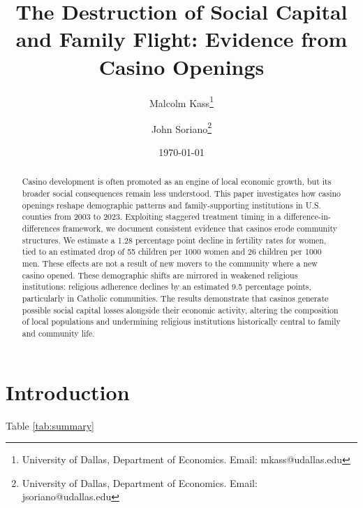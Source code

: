 \documentclass[12pt]{article}
\title{The Destruction of Social Capital and Family Flight: Evidence from Casino Openings}
\author{Malcolm Kass\thanks{University of Dallas, Department of Economics. Email: mkass@udallas.edu} \and John Soriano\thanks{University of Dallas, Department of Economics. Email: jsoriano@udallas.edu}}
\date{\today}
\begin{document}
\maketitle

\begin{abstract}
Casino development is often promoted as an engine of local economic growth, but its broader social consequences remain less understood. This paper investigates how casino openings reshape demographic patterns and family-supporting institutions in U.S. counties from 2003 to 2023. Exploiting staggered treatment timing in a difference-in-differences framework, we document consistent evidence that casinos erode community structures. We estimate a 1.28 percentage point decline in fertility rates for women, tied to an estimated drop of 55 children per 1000 women and 26 children per 1000 men. These effects are not a result of new movers to the community where a new casino opened. These demographic shifts are mirrored in weakened religious institutions: religious adherence declines by an estimated 9.5 percentage points, particularly in Catholic communities. The results demonstrate that casinos generate possible social capital losses alongside their economic activity, altering the composition of local populations and undermining religious institutions historically central to family and community life.
\end{abstract}

\newpage

\section{Introduction}

Table \ref{tab:summary} 


\end{document}
